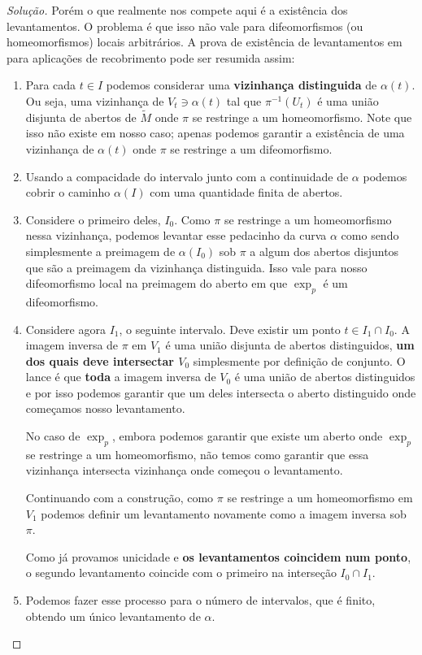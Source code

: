 \begin{proof}[Solução]
Porém o que realmente nos compete aqui é a existência dos levantamentos. O problema é que isso não vale para difeomorfismos (ou homeomorfismos) locais arbitrários. A prova de existência de levantamentos em \cite{docsu} para aplicações de recobrimento pode ser resumida assim:
\begin{enumerate}[label=(\alph*)]
\item Para cada \(t \in I\) podemos considerar uma \textbf{vizinhança distinguida} de \(\alpha(t)\). Ou seja, uma vizinhança de \(V_t \ni \alpha(t)\) tal que \(\pi^{-1}(U_t)\) é uma união disjunta de abertos de \(\tilde{M}\) onde \(\pi\) se restringe a um homeomorfismo. Note que isso não existe em nosso caso; apenas podemos garantir a existência de uma vizinhança de \(\alpha(t)\) onde \(\pi\) se restringe a um difeomorfismo.
\item Usando a compacidade do intervalo junto com a continuidade de \(\alpha\) podemos cobrir o caminho \(\alpha(I)\) com uma quantidade finita de abertos.
\item Considere o primeiro deles, \(I_0\). Como \(\pi\) se restringe a um homeomorfismo nessa vizinhança, podemos levantar esse pedacinho da curva \(\alpha\) como sendo simplesmente a preimagem de \(\alpha(I_0)\) sob \(\pi\) a algum dos abertos disjuntos que são a preimagem da vizinhança distinguida. Isso vale para nosso difeomorfismo local na preimagem do aberto em que \(\operatorname{exp}_p\) é um difeomorfismo.
\item Considere agora \(I_1\), o seguinte intervalo. Deve existir um ponto \(t \in I_1 \cap I_0\). A imagem inversa de \(\pi\) em \(V_1\) é uma união disjunta de abertos distinguidos, \textbf{um dos quais deve intersectar \(V_0\)} simplesmente por definição de conjunto. O lance é que \textbf{toda}  a imagem inversa de \(V_0\) é uma união de abertos distinguidos e por isso podemos garantir que um deles intersecta o aberto distinguido onde começamos nosso levantamento.

	No caso de \(\operatorname{exp}_p\), embora podemos garantir que existe um aberto onde \(\operatorname{exp}_p\) se restringe a um homeomorfismo, não temos como garantir que essa vizinhança intersecta vizinhança onde começou o levantamento. 

Continuando com a construção, como \( \pi\) se restringe a um homeomorfismo em \(V_1\) podemos definir um levantamento novamente como a imagem inversa sob \(\pi\).

Como já provamos unicidade e \textbf{os levantamentos coincidem num ponto}, o segundo levantamento coincide com o primeiro na interseção \(I_0 \cap I_1\).
\item Podemos fazer esse processo para o número de intervalos, que é finito, obtendo um único levantamento de \(\alpha\).
\end{enumerate}


\end{proof}
